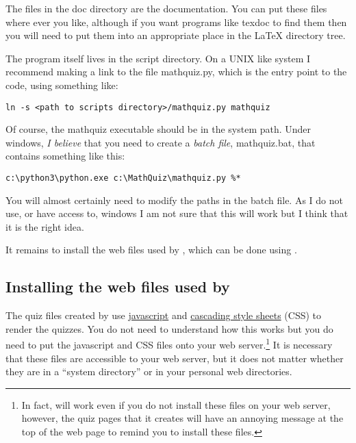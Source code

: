 \documentclass[svgnames]{article}
\begin{document}
    The files in the \textsf{doc} directory are the documentation. You can
    put these files where ever you like, although if you want programs
    like \textsf{texdoc} to find them then you will need to put them
    into an appropriate place in the \LaTeX{} directory tree.

    The \MathQuiz program itself lives in the script directory. On a UNIX
    like system I recommend making a link to the file mathquiz.py, which is
    the entry point to the code, using something like:
    \begin{center}
        \Verb|ln -s <path to scripts directory>/mathquiz.py mathquiz|
    \end{center}
    Of course, the \textsf{mathquiz} executable should be in
    the system path. Under windows, \textit{I believe} that you need to create a
    \textit{batch file}, \textsf{mathquiz.bat}, that contains something like this:
    \begin{center}
        \Verb|c:\python3\python.exe c:\MathQuiz\mathquiz.py %
    \end{center}
    You will almost certainly need to modify the paths in the batch
    file. As I do not use, or have access to, windows I am not sure that
    this will work but I think that it is the right idea.

    It remains to install the web files used by \MathQuiz, which can be
    done using \MathQuiz.
    \fi

    \subsection{Installing the web files used by \MathQuiz}

     The quiz files created by \MathQuiz use
     \href{https://en.wikipedia.org/wiki/JavaScript}{javascript} and
     \href{https://www.w3schools.com/css/css_intro.asp}{cascading style
     sheets} (CSS) to render the quizzes. You do not need to understand
     how this works but you do need to put the \MathQuiz javascript and
     CSS files onto your web server.\footnote{In fact, \MathQuiz will work
     even if you do not install these files on your web server, however,
     the quiz pages that it creates will have an annoying message at the
     top of the web page to remind you to install these files.} It is
     necessary that these files are accessible to your web server, but
     it does not matter whether they are in a ``system directory'' or in
     your personal web directories.
\end{document}
